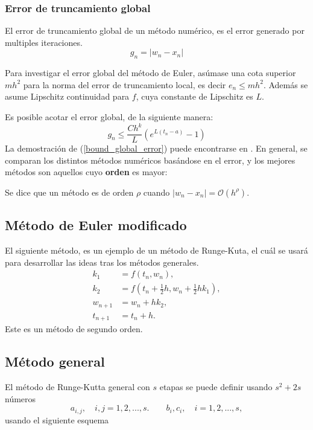 \subsubsection{Error de truncamiento global}
El error de truncamiento global de un método numérico, es el error generado por multiples iteraciones. 
\begin{equation}
    g_n = |w_n - x_n|
\end{equation}

Para investigar el error global del método de Euler, asúmase una cota superior $mh^2$ para la norma del error de truncamiento local, es decir $e_n \leq mh^2$. Además se asume Lipschitz continuidad para $f$, cuya constante de Lipschitz es $L$.

Es posible acotar el error global, de la siguiente manera:
\begin{equation}
    \label{bound_global_error}
    g_n \leq \frac{Ch^k}{L}(e^{L(t_n-a)}-1)
\end{equation}
La demostración de (\ref{bound_global_error}) puede encontrarse en \cite{sauer}. En general, se comparan los distintos métodos numéricos basándose en el error, y los mejores métodos son aquellos cuyo \textbf{orden} es mayor:
\begin{definition}
    Se dice que un método es de orden $\rho$ cuando $|w_n - x_n| = \mathcal O(h^{\rho})$.
\end{definition}

\subsection{Método de Euler modificado}
El siguiente método, es un ejemplo de un método de Runge-Kuta, el cuál se usará para desarrollar las ideas tras los métodos generales.
\begin{align*}
    k_1 &= f(t_n, w_n),\\
    k_2 &= f(t_n + \tfrac{1}{2}h,w_n + \tfrac{1}{2}hk_1),\\
    w_{n+1} &= w_n + hk_2,\\
    t_{n+1} &= t_{n}+h.
\end{align*}
Este es un método de segundo orden. 
\subsection{Método general}
El método de Runge-Kutta general con $s$ etapas se puede definir usando $s^2 + 2s$ números
\begin{equation}
    a_{i,j}, \quad i,j = 1,2,..., s. \qquad b_i, c_i, \quad i= 1, 2, ..., s,
\end{equation}
usando el siguiente esquema

